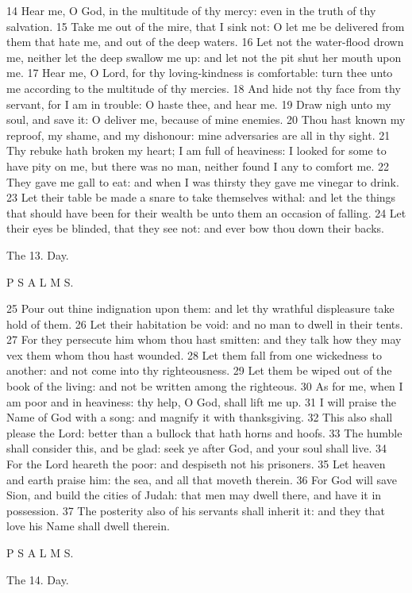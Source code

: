 14 Hear me, O God, in the multitude of thy mercy: even in the truth of thy salvation. 15 Take me out of the mire, that I sink not: O let me be delivered from them that hate me, and out of the deep waters. 16 Let not the water-flood drown me, neither let the deep swallow me up: and let not the pit shut her mouth upon me. 17 Hear me, O Lord, for thy loving-kindness is comfortable: turn thee unto me according to the multitude of thy mercies. 18 And hide not thy face from thy servant, for I am in trouble: O haste thee, and hear me. 19 Draw nigh unto my soul, and save it: O deliver me, because of mine enemies. 20 Thou hast known my reproof, my shame, and my dishonour: mine adversaries are all in thy sight. 21 Thy rebuke hath broken my heart; I am full of heaviness: I looked for some to have pity on me, but there was no man, neither found I any to comfort me. 22 They gave me gall to eat: and when I was thirsty they gave me vinegar to drink. 23 Let their table be made a snare to take themselves withal: and let the things that should have been for their wealth be unto them an occasion of falling. 24 Let their eyes be blinded, that they see not: and ever bow thou down their backs.

The 13. Day.

P S A L M S.

25 Pour out thine indignation upon them: and let thy wrathful displeasure take hold of them. 26 Let their habitation be void: and no man to dwell in their tents. 27 For they persecute him whom thou hast smitten: and they talk how they may vex them whom thou hast wounded. 28 Let them fall from one wickedness to another: and not come into thy righteousness. 29 Let them be wiped out of the book of the living: and not be written among the righteous. 30 As for me, when I am poor and in heaviness: thy help, O God, shall lift me up. 31 I will praise the Name of God with a song: and magnify it with thanksgiving. 32 This also shall please the Lord: better than a bullock that hath horns and hoofs. 33 The humble shall consider this, and be glad: seek ye after God, and your soul shall live. 34 For the Lord heareth the poor: and despiseth not his prisoners. 35 Let heaven and earth praise him: the sea, and all that moveth therein. 36 For God will save Sion, and build the cities of Judah: that men may dwell there, and have it in possession. 37 The posterity also of his servants shall inherit it: and they that love his Name shall dwell therein.

P S A L M S.

The 14. Day.

